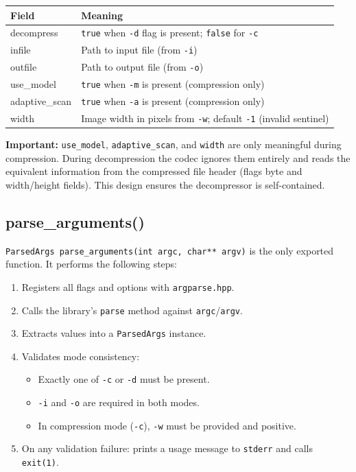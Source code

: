 \begin{center}
\begin{tabular}{>{\ttfamily}l l}
\toprule
\textbf{Field} & \textbf{Meaning} \\
\midrule
decompress     & \texttt{true} when \texttt{-d} flag is present; \texttt{false} for \texttt{-c} \\
infile         & Path to input file (from \texttt{-i}) \\
outfile        & Path to output file (from \texttt{-o}) \\
use\_model     & \texttt{true} when \texttt{-m} is present (compression only) \\
adaptive\_scan & \texttt{true} when \texttt{-a} is present (compression only) \\
width          & Image width in pixels from \texttt{-w}; default \texttt{-1} (invalid sentinel) \\
\bottomrule
\end{tabular}
\end{center}

\textbf{Important:} \texttt{use\_model}, \texttt{adaptive\_scan}, and \texttt{width} are only
meaningful during compression.
During decompression the codec ignores them entirely and reads the equivalent information
from the compressed file header (flags byte and width/height fields).
This design ensures the decompressor is self-contained.

\subsection{parse\_arguments()}

\texttt{ParsedArgs parse\_arguments(int argc, char** argv)} is the only exported function.
It performs the following steps:

\begin{enumerate}
  \item Registers all flags and options with \texttt{argparse.hpp}.
  \item Calls the library's \texttt{parse} method against \texttt{argc}/\texttt{argv}.
  \item Extracts values into a \texttt{ParsedArgs} instance.
  \item Validates mode consistency:
    \begin{itemize}
      \item Exactly one of \texttt{-c} or \texttt{-d} must be present.
      \item \texttt{-i} and \texttt{-o} are required in both modes.
      \item In compression mode (\texttt{-c}), \texttt{-w} must be provided and positive.
    \end{itemize}
  \item On any validation failure: prints a usage message to \texttt{stderr} and calls
        \texttt{exit(1)}.
\end{enumerate}

